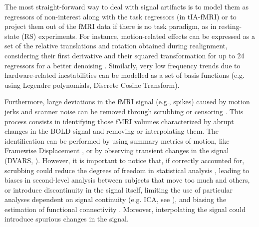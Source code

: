 The most straight-forward way to deal with signal artifacts is to model them as
regressors of non-interest along with the task regressors (in tIA-fMRI) or to
project them out of the fMRI data if there is no task paradigm, as in
resting-state (RS) experiments. For instance, motion-related effects can be
expressed as a set of the relative translations and rotation obtained during
realignment, considering their first derivative and their squared transformation
for up to 24 regressors for a better denoising
\citep{Friston1994Statisticalparametricmaps}. Similarly, very low frequency
trends due to hardware-related inestabilities can be modelled as a set of basis
functions (e.g. using Legendre polynomials, Discrete Cosine Transform).

Furthermore, large deviations in the fMRI signal (e.g., spikes) caused by motion
jerks and scanner noise can be removed through scrubbing or censoring
\citep{Power2012Spurioussystematiccorrelations}. This process consists in
identifying those fMRI volumes characterized by abrupt changes in the BOLD
signal and removing or interpolating them. The identification can be performed
by using summary metrics of motion, like Framewise Displacement
\citep{Power2012Spurioussystematiccorrelations}, or by observing transient
changes in the signal (DVARS, \cite{Power2012Spurioussystematiccorrelations,
Smyser2010LongitudinalAnalysisNeural}). However, it is important to notice that,
if correctly accounted for, scrubbing could reduce the degrees of freedom in
statistical analysis \citep{Mascali2021Evaluationdenoisingstrategies}, leading
to biases in second-level analysis between subjects that move too much and
others, or introduce discontinuity in the signal itself, limiting the use of
particular analyses dependent on signal continuity (e.g. ICA, see
\cite{CaballeroGaudes2017MethodscleaningBOLD}), and biasing the estimation of
functional connectivity \citep{Mascali2021Evaluationdenoisingstrategies}.
Moreover, interpolating the signal could introduce spurious changes in the
signal.

